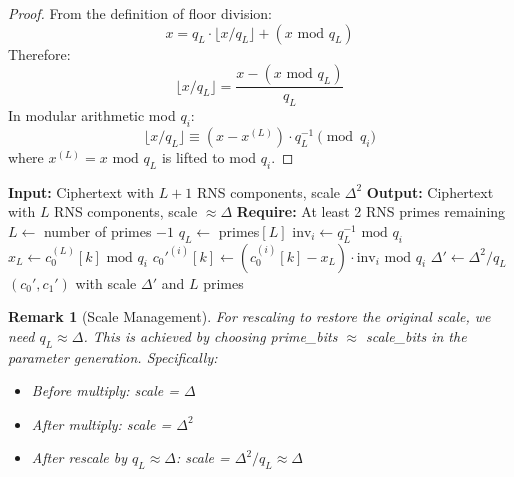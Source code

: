 \documentclass[11pt,a4paper]{article}
\newtheorem{remark}{Remark}
\newcommand{\bmod}{\text{ mod }}
\begin{document}
\begin{proof}
From the definition of floor division:
\[
x = q_L \cdot \lfloor x / q_L \rfloor + (x \bmod q_L)
\]
Therefore:
\[
\lfloor x / q_L \rfloor = \frac{x - (x \bmod q_L)}{q_L}
\]
In modular arithmetic mod $q_i$:
\[
\lfloor x / q_L \rfloor \equiv (x - x^{(L)}) \cdot q_L^{-1} \pmod{q_i}
\]
where $x^{(L)} = x \bmod q_L$ is lifted to mod $q_i$.
\end{proof}

\begin{algorithm}[H]
\caption{Modular Reduction (Rescale)}
\begin{algorithmic}[1]
    \State \textbf{Input:} Ciphertext with $L+1$ RNS components, scale $\Delta^2$
    \State \textbf{Output:} Ciphertext with $L$ RNS components, scale $\approx \Delta$
    \State \textbf{Require:} At least 2 RNS primes remaining
    \State
    \State $L \gets$ number of primes $- 1$
    \State $q_L \gets$ primes$[L]$ 
    \State
    \State {}
        \State $\text{inv}_i \gets q_L^{-1} \bmod q_i$
    \EndFor
    \State
    \State {}
            \State $x_L \gets c_0^{(L)}[k] \bmod q_i$ 
            \State $c_0'^{(i)}[k] \gets (c_0^{(i)}[k] - x_L) \cdot \text{inv}_i \bmod q_i$
        \EndFor
    \EndFor
    \State {}
    \State
    \State $\Delta' \gets \Delta^2 / q_L$ 
    \State \Return $(c_0', c_1')$ with scale $\Delta'$ and $L$ primes
\EndFunction
\end{algorithmic}
\end{algorithm}

\begin{remark}[Scale Management]
For rescaling to restore the original scale, we need $q_L \approx \Delta$. This is achieved by choosing prime\_bits $\approx$ scale\_bits in the parameter generation. Specifically:
\begin{itemize}
    \item Before multiply: scale = $\Delta$
    \item After multiply: scale = $\Delta^2$
    \item After rescale by $q_L \approx \Delta$: scale = $\Delta^2 / q_L \approx \Delta$
\end{itemize}
\end{remark}
\end{document}
